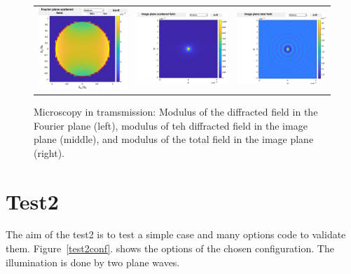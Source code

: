 \begin{figure}[H]
\begin{center}
\begin{tabular}{ccc}
  \includegraphics*[width=5.0cm,draft=false]{test1fourier.eps}
& \includegraphics*[width=5.0cm,draft=false]{test1image.eps}
&  \includegraphics*[width=5.0cm,draft=false]{test1imageinc.eps}
\end{tabular}

\end{center}
\caption{Microscopy in tramsmission: Modulus of the diffracted field
  in the Fourier plane (left), modulus of teh diffracted field in the
  image plane (middle), and modulus of the total field in the image
  plane (right).}
\end{figure}

\section{Test2}

The aim of the test2 is to test a simple case and many options code to
validate them.  Figure~\ref{test2conf}. shows the options of the
chosen configuration. The illumination is done by two plane waves.


